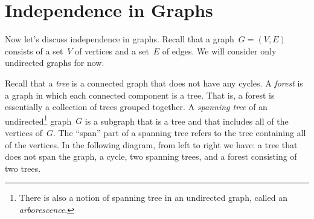 \documentclass[twoside]{article}
\begin{document}
\section{Independence in Graphs}

Now let's discuss independence in graphs.
Recall that a graph~${G = (V, E)}$ consists of a set~$V$ of vertices and a set~$E$ of edges.
We will consider only undirected graphs for now.

Recall that a \emph{tree} is a connected graph that does not have any cycles.
A \emph{forest} is a graph in which each connected component is a tree.
That is, a forest is essentially a collection of trees grouped together.
A \emph{spanning tree} of an undirected\footnote{ There is also a notion of spanning tree in an undirected graph, called an \emph{arborescence}.} graph~$G$ is a subgraph that is a tree and that includes all of the vertices of~$G$.
The ``span'' part of a spanning tree refers to the tree containing all of the vertices.
In the following diagram, from left to right we have: a tree that does not span the graph, a cycle, two spanning trees, and a forest consisting of two trees.
\end{document}
